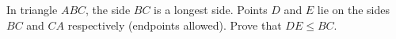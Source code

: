 In triangle $ABC$, the side $BC$ is a longest side. Points $D$ and $E$ lie on the sides $BC$ and $CA$ respectively (endpoints allowed). Prove that $DE\le BC$.
